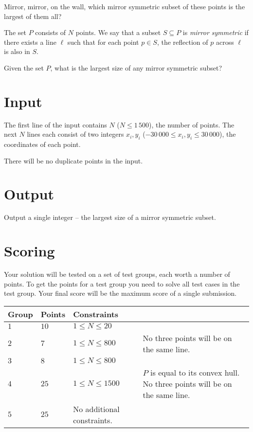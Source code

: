 Mirror, mirror, on the wall, which mirror symmetric subset of these points is the largest of them all?

The set $P$ consists of $N$ points.
We say that a subset $S \subseteq P$ is \emph{mirror symmetric} if there exists a line $\ell$ such that for each point $p \in S$, the reflection of $p$ across $\ell$ is also in $S$.

Given the set $P$, what is the largest size of any mirror symmetric subset?

\section*{Input}
The first line of the input contains $N$ ($N \le 1\,500$), the number of points.
The next $N$ lines each consist of two integers $x_i, y_i$ ($-30\,000 \le x_i, y_i \le 30\,000$), the coordinates of each point.

There will be no duplicate points in the input.

\section*{Output}
Output a single integer -- the largest size of a mirror symmetric subset.

\section*{Scoring}
Your solution will be tested on a set of test groups, each worth a number of points.
To get the points for a test group you need to solve all test cases in the test group.
Your final score will be the maximum score of a single submission.

\noindent
\begin{tabular}{| l | l | l | p{7cm} |}
\hline
Group & Points & Constraints \\ \hline
$1$   & $10$   & $1 \leq N \leq 20$ & \\ \hline
$2$   & $7$    & $1 \leq N \leq 800$ & No three points will be on the same line.\\ \hline
$3$   & $8$    & $1 \leq N \leq 800$ & \\ \hline
$4$   & $25$   & $1 \leq N \leq 1500$ & $P$ is equal to its convex hull. No three points will be on the same line.\\ \hline
$5$   & $25$   & No additional constraints. & \\ \hline
\end{tabular}
